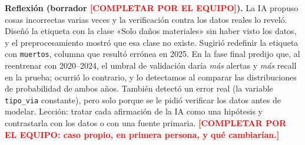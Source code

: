 \documentclass[conference]{IEEEtran}
\newcommand{\pend}[1]{\textcolor{red}{\textbf{[#1]}}}
\begin{document}
\textbf{Reflexión (borrador \pend{COMPLETAR POR EL EQUIPO}).} La IA propuso cosas incorrectas varias veces y la verificación
contra los datos reales lo reveló. Diseñó la etiqueta con la clase «Solo daños materiales» sin haber visto los datos, y el
preprocesamiento mostró que esa clase no existe. Sugirió redefinir la etiqueta con \texttt{muertos}, columna que resultó errónea en
2025. En la fase final predijo que, al reentrenar con 2020--2024, el umbral de validación daría \emph{más} alertas y \emph{más}
recall en la prueba; ocurrió lo contrario, y lo detectamos al comparar las distribuciones de probabilidad de ambos años. También
detectó un error real (la variable \texttt{tipo\_via} constante), pero solo porque se le pidió verificar los datos antes de modelar.
Lección: tratar cada afirmación de la IA como una hipótesis y contrastarla con los datos o con una fuente primaria.
\pend{COMPLETAR POR EL EQUIPO: caso propio, en primera persona, y qué cambiarían.}



\end{document}
